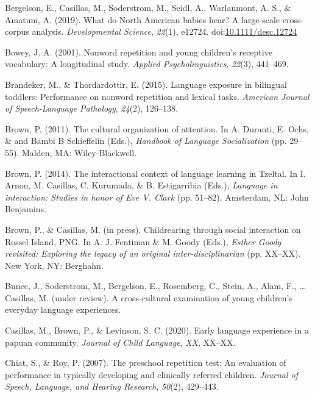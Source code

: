 \documentclass[english,,man,floatsintext]{apa6}
\begin{document}
\hypertarget{ref-bergelsoncasillas2019what}{}
Bergelson, E., Casillas, M., Soderstrom, M., Seidl, A., Warlaumont, A.
S., \& Amatuni, A. (2019). What do North American babies hear? A
large-scale cross-corpus analysis. \emph{Developmental Science},
\emph{22}(1), e12724.
doi:\href{https://doi.org/10.1111/desc.12724}{10.1111/desc.12724}

\hypertarget{ref-bowey2001nonword}{}
Bowey, J. A. (2001). Nonword repetition and young children's receptive
vocabulary: A longitudinal study. \emph{Applied Psycholinguistics},
\emph{22}(3), 441--469.

\hypertarget{ref-brandeker2015language}{}
Brandeker, M., \& Thordardottir, E. (2015). Language exposure in
bilingual toddlers: Performance on nonword repetition and lexical tasks.
\emph{American Journal of Speech-Language Pathology}, \emph{24}(2),
126--138.

\hypertarget{ref-brown2011cultural}{}
Brown, P. (2011). The cultural organization of attention. In A. Duranti,
E. Ochs, \& and Bambi B Schieffelin (Eds.), \emph{Handbook of Language
Socialization} (pp. 29--55). Malden, MA: Wiley-Blackwell.

\hypertarget{ref-brown2014interactional}{}
Brown, P. (2014). The interactional context of language learning in
Tzeltal. In I. Arnon, M. Casillas, C. Kurumada, \& B. Estigarribia
(Eds.), \emph{Language in interaction: Studies in honor of Eve V. Clark}
(pp. 51--82). Amsterdam, NL: John Benjamins.

\hypertarget{ref-brownIPchildrearing}{}
Brown, P., \& Casillas, M. (in press). Childrearing through social
interaction on Rossel Island, PNG. In A. J. Fentiman \& M. Goody (Eds.),
\emph{Esther Goody revisited: Exploring the legacy of an original
inter-disciplinarian} (pp. XX--XX). New York, NY: Berghahn.

\hypertarget{ref-bunceURcrosscultural}{}
Bunce, J., Soderstrom, M., Bergelson, E., Rosemberg, C., Stein, A.,
Alam, F., \ldots{} Casillas, M. (under review). A cross-cultural
examination of young children's everyday language experiences.

\hypertarget{ref-casillas2020early}{}
Casillas, M., Brown, P., \& Levinson, S. C. (2020). Early language
experience in a papuan community. \emph{Journal of Child Language},
\emph{XX}, XX--XX.

\hypertarget{ref-chiat2007preschool}{}
Chiat, S., \& Roy, P. (2007). The preschool repetition test: An
evaluation of performance in typically developing and clinically
referred children. \emph{Journal of Speech, Language, and Hearing
Research}, \emph{50}(2), 429--443.
\end{document}
